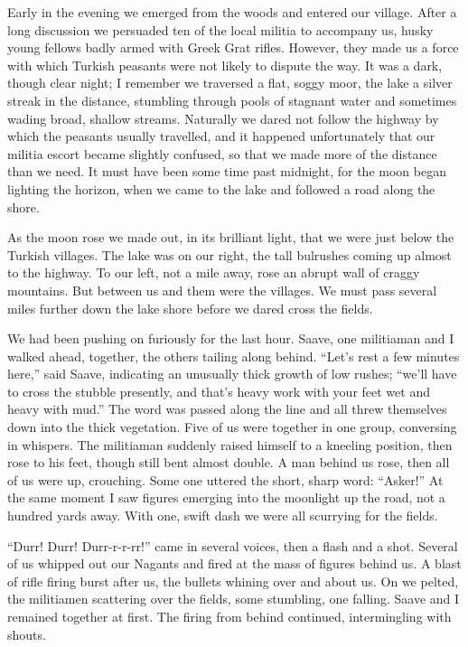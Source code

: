 \documentclass[a5paper,12pt]{book}
\begin{document}
Early in the evening we emerged from the woods and entered our village. After a long discussion we persuaded ten of the local militia to accompany us, husky young fellows badly armed with Greek Grat rifles. However, they made us a force with which Turkish peasants were not likely to dispute the way.
It was a dark, though clear night; I remember we traversed a flat, soggy moor, the lake a silver streak in the distance, stumbling through pools of stagnant water and sometimes wading broad, shallow streams. Naturally we dared not follow the highway by which the peasants usually travelled, and it happened unfortunately that our militia escort became slightly confused, so that we made more of the distance than we need. It must have been some time past midnight, for the moon began lighting the horizon, when we came to the lake and followed a road along the shore.

As the moon rose we made out, in its brilliant light, that we were just below the Turkish villages. The lake was on our right, the tall bulrushes coming up almost to the highway. To our left, not a mile away, rose an abrupt wall of craggy mountains. But between us and them were the villages. We must pass several miles further down the lake shore before we dared cross the fields.

We had been pushing on furiously for the last hour. Saave, one militiaman and I walked ahead, together, the others tailing along behind. “Let’s rest a few minutes here,” said Saave, indicating an unusually thick growth of low rushes; “we’ll have to cross the stubble presently, and that’s heavy work with your feet wet and heavy with mud.” The word was passed along the line and all threw themselves down into the thick vegetation. Five of us were together in one group, conversing in whispers. The militiaman suddenly raised himself to a kneeling position, then rose to his feet, though still bent almost double. A man behind us rose, then all of us were up, crouching. Some one uttered the short, sharp word: “Asker!” At the same moment I saw figures emerging into the moonlight up the road, not a hundred yards away. With one, swift dash we were all scurrying for the fields.

“Durr! Durr! Durr-r-r-rr!” came in several voices, then a flash and a shot. Several of us whipped out our Nagants and fired at the mass of figures behind us. A blast of rifle firing burst after us, the bullets whining over and about us. On we pelted, the militiamen scattering over the fields, some stumbling, one falling. Saave and I remained together at first. The firing from behind continued, intermingling with shouts.
\end{document}
